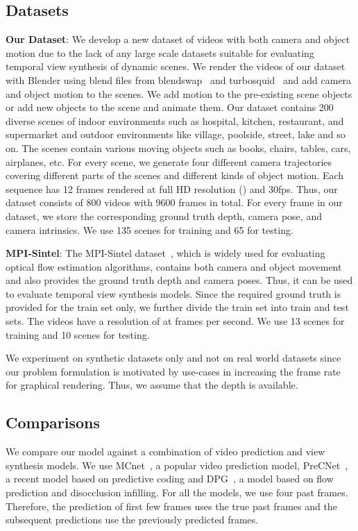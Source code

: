 \documentclass[preprint]{vgtc}
\begin{document}
    \subsection{Datasets}\label{subsec:datasets}
    \textbf{Our Dataset}: We develop a new dataset of videos with both camera and object motion due to the lack of any large scale datasets suitable for evaluating temporal view synthesis of dynamic scenes.
    We render the videos of our dataset with Blender using blend files from blendswap~\cite{blendswap2021blendswap} and turbosquid~\cite{turbosquid2021turbosquid} and add camera and object motion to the scenes.
    We add motion to the pre-existing scene objects or add new objects to the scene and animate them.
    Our dataset contains 200 diverse scenes of indoor environments such as hospital, kitchen, restaurant, and supermarket and outdoor environments like village, poolside, street, lake and so on.
    The scenes contain various moving objects such as books, chairs, tables, cars, airplanes, etc.
    For every scene, we generate four different camera trajectories covering different parts of the scenes and different kinds of object motion.
    Each sequence has 12 frames rendered at full HD resolution () and 30fps.
    Thus, our dataset consists of 800 videos with 9600 frames in total.
    For every frame in our dataset, we store the corresponding ground truth depth, camera pose, and camera intrinsics.
    We use 135 scenes for training and 65 for testing.

    \textbf{MPI-Sintel}: The MPI-Sintel dataset~\cite{butler2012sintel}, which is widely used for evaluating optical flow estimation algorithms, contains both camera and object movement and also provides the ground truth depth and camera poses.
    Thus, it can be used to evaluate temporal view synthesis models.
    Since the required ground truth is provided for the train set only, we further divide the train set into train and test sets.
    The videos have a resolution of  at  frames per second.
    We use 13 scenes for training and 10 scenes for testing.


    We experiment on synthetic datasets only and not on real world datasets since our problem formulation is motivated by use-cases in increasing the frame rate for graphical rendering.
    Thus, we assume that the depth is available.

    \subsection{Comparisons}\label{subsec:comparisons}
    We compare our model against a combination of video prediction and view synthesis models.
    We use MCnet~\cite{villegas2017mcnet}, a popular video prediction model, PreCNet~\cite{straka2020precnet}, a recent model based on predictive coding and DPG~\cite{gao2019disentangling}, a model based on flow prediction and disocclusion infilling.
    For all the models, we use four past frames.
    Therefore, the prediction of first few frames uses the true past frames and the subsequent predictions use the previously predicted frames.
\end{document}
